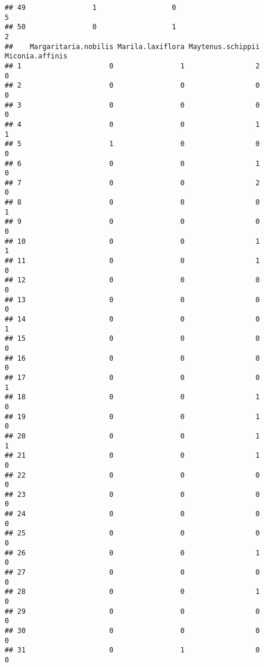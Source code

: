 \documentclass[
]{article}
\begin{document}
\begin{verbatim}
## 49                1                  0                              5
## 50                0                  1                              2
##    Margaritaria.nobilis Marila.laxiflora Maytenus.schippii Miconia.affinis
## 1                     0                1                 2               0
## 2                     0                0                 0               0
## 3                     0                0                 0               0
## 4                     0                0                 1               1
## 5                     1                0                 0               0
## 6                     0                0                 1               0
## 7                     0                0                 2               0
## 8                     0                0                 0               1
## 9                     0                0                 0               0
## 10                    0                0                 1               1
## 11                    0                0                 1               0
## 12                    0                0                 0               0
## 13                    0                0                 0               0
## 14                    0                0                 0               1
## 15                    0                0                 0               0
## 16                    0                0                 0               0
## 17                    0                0                 0               1
## 18                    0                0                 1               0
## 19                    0                0                 1               0
## 20                    0                0                 1               1
## 21                    0                0                 1               0
## 22                    0                0                 0               0
## 23                    0                0                 0               0
## 24                    0                0                 0               0
## 25                    0                0                 0               0
## 26                    0                0                 1               0
## 27                    0                0                 0               0
## 28                    0                0                 1               0
## 29                    0                0                 0               0
## 30                    0                0                 0               0
## 31                    0                1                 0               0

\end{verbatim}
\end{document}
